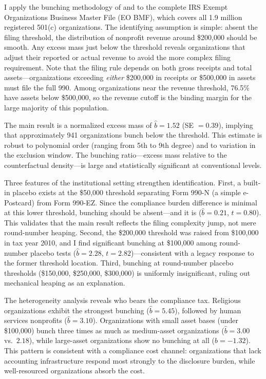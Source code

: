 \documentclass[12pt]{article}
\begin{document}
I apply the bunching methodology of \citet{saez2010taxpayers} and \citet{kleven2016bunching} to the complete IRS Exempt Organizations Business Master File (EO BMF), which covers all 1.9 million registered 501(c) organizations. The identifying assumption is simple: absent the filing threshold, the distribution of nonprofit revenue around \$200,000 should be smooth. Any excess mass just below the threshold reveals organizations that adjust their reported or actual revenue to avoid the more complex filing requirement. Note that the filing rule depends on both gross receipts and total assets---organizations exceeding \textit{either} \$200,000 in receipts or \$500,000 in assets must file the full 990. Among organizations near the revenue threshold, 76.5\% have assets below \$500,000, so the revenue cutoff is the binding margin for the large majority of this population.

The main result is a normalized excess mass of $\hat{b} = 1.52$ (SE $= 0.39$), implying that approximately 941 organizations bunch below the threshold. This estimate is robust to polynomial order (ranging from 5th to 9th degree) and to variation in the exclusion window. The bunching ratio---excess mass relative to the counterfactual density---is large and statistically significant at conventional levels.

Three features of the institutional setting strengthen identification. First, a built-in placebo exists at the \$50,000 threshold separating Form 990-N (a simple e-Postcard) from Form 990-EZ. Since the compliance burden difference is minimal at this lower threshold, bunching should be absent---and it is ($\hat{b} = 0.21$, $t = 0.80$). This validates that the main result reflects the filing complexity jump, not mere round-number heaping. Second, the \$200,000 threshold was raised from \$100,000 in tax year 2010, and I find significant bunching at \$100,000 among round-number placebo tests ($\hat{b} = 2.28$, $t = 2.82$)---consistent with a legacy response to the former threshold location. Third, bunching at round-number placebo thresholds (\$150,000, \$250,000, \$300,000) is uniformly insignificant, ruling out mechanical heaping as an explanation.

The heterogeneity analysis reveals who bears the compliance tax. Religious organizations exhibit the strongest bunching ($\hat{b} = 5.45$), followed by human services nonprofits ($\hat{b} = 3.10$). Organizations with small asset bases (under \$100,000) bunch three times as much as medium-asset organizations ($\hat{b} = 3.00$ vs.\ $2.18$), while large-asset organizations show no bunching at all ($\hat{b} = -1.32$). This pattern is consistent with a compliance cost channel: organizations that lack accounting infrastructure respond most strongly to the disclosure burden, while well-resourced organizations absorb the cost.
\end{document}
